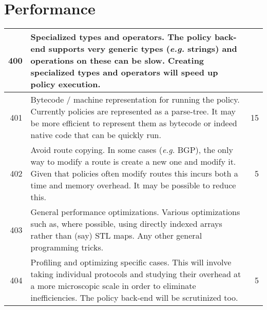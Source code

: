 \documentclass[letterpaper]{article}
\begin{document}
\section{Performance}
\begin{center}
\tabletail{
\hline
}
\begin{supertabular}{|r |p{12cm} |r|}
\hline

400 &
Specialized types and operators.  The policy back-end supports very generic types
({\em e.g.} strings) and operations on these can be slow.  Creating specialized
types and operators will speed up policy execution.
&   \\
\hline

401 &
Bytecode / machine representation for running the policy.  Currently policies
are represented as a parse-tree.  It may be more efficient to represent them as
bytecode or indeed native code that can be quickly run.
& 15 \\
\hline

402 &
Avoid route copying.  In some cases ({\em e.g.} BGP), the only way to modify a
route is create a new one and modify it.  Given that policies often modify
routes this incurs both a time and memory overhead.  It may be possible to
reduce this.
& 5 \\
\hline

403 &
General performance optimizations.  Various optimizations such as, where
possible, using directly indexed arrays rather than (say) STL maps.  Any other
general programming tricks.
&   \\
\hline

404 &
Profiling and optimizing specific cases.  This will involve taking individual
protocols and studying their overhead at a more microscopic scale in order to
eliminate inefficiencies.  The policy back-end will be scrutinized too.
& 5  \\

\end{supertabular}
\end{center}
\end{document}
